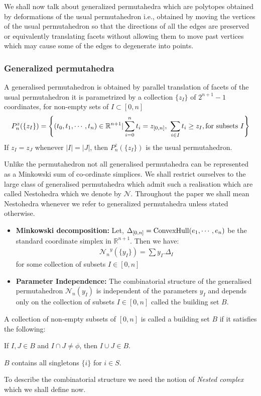 \documentclass[hidelinks,12pt]{article}
\newcommand{\bea}[1]{\begin{eqnarray}\label{#1} }
\newcommand{\eea}{\end{eqnarray}}
\def\bea{\begin{eqnarray}}
\def\eea{\end{eqnarray}}
\begin{document}
We shall now talk about generalized permutahedra which are polytopes obtained by deformations of the usual permutahedron i.e., obtained by moving the vertices of the usual permutahedron so that the directions of all the edges are preserved or equivalently translating facets without allowing them to move past vertices which may cause some of the edges to degenerate into points.

\subsubsection*{Generalized permutahedra}

A  generalised permutahedron is obtained by parallel translation of facets of the usual permutahedron it is parametrized  by a collection $\{ z_I\}$ of $2^{n+1}-1$ coordinates, for non-empty sets of $I \subset [0,n] $
 \bea \label{genperm_defi}
 P_n^z(\{ z_I \}) = \left \{ (t_0 , t_1, \cdots , t_{n}) \in \mathbb{R}^{n+1} | \sum_{i=0}^{n} t_i = z_{[0,n]},~ \sum_{i \in I} t_i \geq z_I, {\rm for ~subsets} ~I  \right  \}
 \eea
 If $z_I =z_J$ whenever $|I| =|J|$, then  $ P_n^z(\{ z_I \})$ is the usual permutahedron. 
 
 Unlike the permutahedron not all generalised permutahedra can be represented as a Minkowski sum of co-ordinate simplices. We shall restrict ourselves to the large class of generalised permutahedra which admit such a realisation which are called Nestohedra which we denote by ${\mathscr N}$. Throughout the paper we shall mean Nestohedra whenever we refer to generalized permutahedra unless stated otherwise.
 \begin{itemize}
 \item {\bf Minkowski decomposition:} Let, $\Delta_{[0,n]} = {\rm ConvexHull}(e_1,\cdots,e_n)$ be the standard coordinate simplex in $\mathbb{R}^{n+1}$. Then we have:
  \bea
{\mathscr N_n}^y(\{y_I \})= \sum y_I . \Delta_I  \nonumber
 \eea
 for some collection of subsets $I \in [0,n]$
 \end{itemize}
  \begin{itemize}
 \item{\bf Parameter Independence:} The combinatorial structure of the generalised permutahedron ${\mathscr N_n({y_I})}$ is independent of the parameters $y_I$ and depends only on the collection of subsets $I \in [0,n]$ called the  building set $B$.  \end{itemize}
A collection of non-empty subsets of $[0,n]$ is called a building set $B$ if it satisfies the following:
\begin{compactenum}[\quad (1)]
    \item If $I,J \in B$ and $I \cap J \neq \phi $, then $I \cup J \in B$.
    \item $B$ contains all singletons $\{ i\}$ for $i \in S$.
\end{compactenum}
To describe the combinatorial structure we need the notion of {\it Nested complex} which we shall define now.
\end{document}
